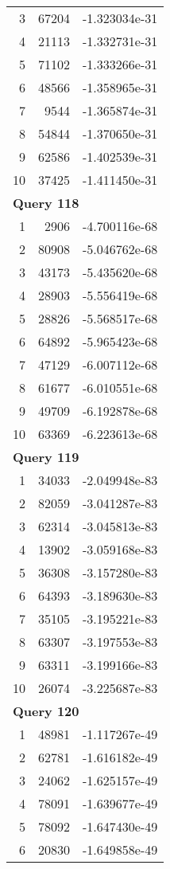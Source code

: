 \begin{longtable}[{p}]{@{}rrp{}@{}}
3 & 67204 & -1.323034e-31 \\
4 & 21113 & -1.332731e-31 \\
5 & 71102 & -1.333266e-31 \\
6 & 48566 & -1.358965e-31 \\
7 & 9544 & -1.365874e-31 \\
8 & 54844 & -1.370650e-31 \\
9 & 62586 & -1.402539e-31 \\
10 & 37425 & -1.411450e-31 \\
\midrule
\multicolumn{3}{l}{\bfseries Query 118} \\
1 & 2906 & -4.700116e-68 \\
2 & 80908 & -5.046762e-68 \\
3 & 43173 & -5.435620e-68 \\
4 & 28903 & -5.556419e-68 \\
5 & 28826 & -5.568517e-68 \\
6 & 64892 & -5.965423e-68 \\
7 & 47129 & -6.007112e-68 \\
8 & 61677 & -6.010551e-68 \\
9 & 49709 & -6.192878e-68 \\
10 & 63369 & -6.223613e-68 \\
\midrule
\multicolumn{3}{l}{\bfseries Query 119} \\
1 & 34033 & -2.049948e-83 \\
2 & 82059 & -3.041287e-83 \\
3 & 62314 & -3.045813e-83 \\
4 & 13902 & -3.059168e-83 \\
5 & 36308 & -3.157280e-83 \\
6 & 64393 & -3.189630e-83 \\
7 & 35105 & -3.195221e-83 \\
8 & 63307 & -3.197553e-83 \\
9 & 63311 & -3.199166e-83 \\
10 & 26074 & -3.225687e-83 \\
\midrule
\multicolumn{3}{l}{\bfseries Query 120} \\
1 & 48981 & -1.117267e-49 \\
2 & 62781 & -1.616182e-49 \\
3 & 24062 & -1.625157e-49 \\
4 & 78091 & -1.639677e-49 \\
5 & 78092 & -1.647430e-49 \\
6 & 20830 & -1.649858e-49 \\

\end{longtable}
